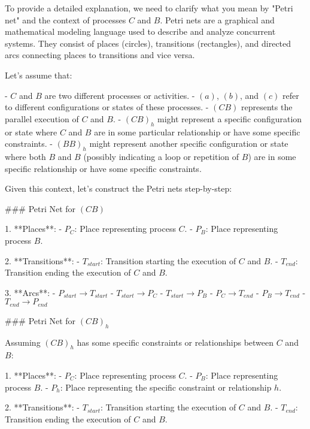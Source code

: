 To provide a detailed explanation, we need to clarify what you mean by "Petri net" and the context of processes \( C \) and \( B \). Petri nets are a graphical and mathematical modeling language used to describe and analyze concurrent systems. They consist of places (circles), transitions (rectangles), and directed arcs connecting places to transitions and vice versa.

Let's assume that:

- \( C \) and \( B \) are two different processes or activities.
- \( (a) \), \( (b) \), and \( (c) \) refer to different configurations or states of these processes.
- \( (C B) \) represents the parallel execution of \( C \) and \( B \).
- \( (C B)_h \) might represent a specific configuration or state where \( C \) and \( B \) are in some particular relationship or have some specific constraints.
- \( (B B)_h \) might represent another specific configuration or state where both \( B \) and \( B \) (possibly indicating a loop or repetition of \( B \)) are in some specific relationship or have some specific constraints.

Given this context, let's construct the Petri nets step-by-step:

### Petri Net for \( (C B) \)

1. **Places**: 
   - \( P_C \): Place representing process \( C \).
   - \( P_B \): Place representing process \( B \).

2. **Transitions**:
   - \( T_{start} \): Transition starting the execution of \( C \) and \( B \).
   - \( T_{end} \): Transition ending the execution of \( C \) and \( B \).

3. **Arcs**:
   - \( P_{start} \rightarrow T_{start} \)
   - \( T_{start} \rightarrow P_C \)
   - \( T_{start} \rightarrow P_B \)
   - \( P_C \rightarrow T_{end} \)
   - \( P_B \rightarrow T_{end} \)
   - \( T_{end} \rightarrow P_{end} \)

### Petri Net for \( (C B)_h \)

Assuming \( (C B)_h \) has some specific constraints or relationships between \( C \) and \( B \):

1. **Places**:
   - \( P_C \): Place representing process \( C \).
   - \( P_B \): Place representing process \( B \).
   - \( P_h \): Place representing the specific constraint or relationship \( h \).

2. **Transitions**:
   - \( T_{start} \): Transition starting the execution of \( C \) and \( B \).
   - \( T_{end} \): Transition ending the execution of \( C \) and \( B \).

